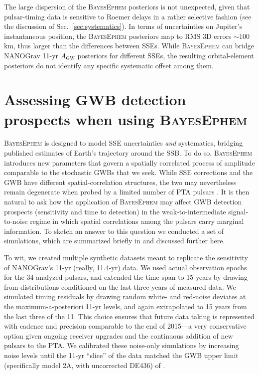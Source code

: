 \documentclass[iop,apj,twocolappendix]{emulateapj}
\begin{document}
The large dispersion of the \textsc{BayesEphem} posteriors is not unexpected, given that pulsar-timing data is sensitive to Roemer delays in a rather selective fashion (see the discussion of Sec.\ \ref{sec:systematics}).
In terms of uncertainties on Jupiter's instantaneous position, the \textsc{BayesEphem} posteriors map to RMS 3D errors $\sim 100$ km, thus larger than the differences between SSEs. While \textsc{BayesEphem} can bridge NANOGrav 11-yr $A_\mathrm{GW}$ posteriors for different SSEs, the resulting orbital-element posteriors %
do not identify any specific systematic offset among them.

\section{Assessing GWB detection prospects when using \textsc{BayesEphem}}
\label{sec:simulations}

\textsc{BayesEphem} is designed to model SSE uncertainties \emph{and} systematics, bridging published estimates of Earth's trajectory around the SSB.
To do so, \textsc{BayesEphem} introduces new parameters that govern a spatially correlated process of amplitude comparable to the stochastic GWBs that we seek.
While SSE corrections and the GWB have different spatial-correlation structures, the two may nevertheless remain degenerate when probed by a limited number of PTA pulsars \citep{2019ApJ...876...55R}.
It is then natural to ask how the application of \textsc{BayesEphem} may affect GWB detection prospects (sensitivity and time to detection) in the weak-to-intermediate signal-to-noise regime in which spatial correlations among the pulsars carry marginal information.
To sketch an answer to this question we conducted a set of simulations, which are summarized briefly in \cite{2018ApJ...859...47A} and discussed further here.

To wit, we created multiple synthetic datasets meant to replicate the sensitivity of NANOGrav's 11-yr (really, 11.4-yr) data. We used actual observation epochs for the 34 analyzed pulsars, and extended the time span to 15 years by drawing from distributions conditioned on the last three years of measured data.
We simulated timing residuals by drawing random white- and red-noise deviates at the maximum-a-posteriori 11-yr levels, and again extrapolated to 15 years from the last three of the 11.
This choice ensures that future data taking is represented with cadence and precision comparable to the end of 2015---a very conservative option given ongoing receiver upgrades and the continuous addition of new pulsars to the PTA.
We calibrated these noise-only simulations by increasing noise levels until the 11-yr ``slice'' of the data matched the GWB upper limit (specifically model 2A, with uncorrected DE436) of \cite{2018ApJ...859...47A}.
\end{document}
